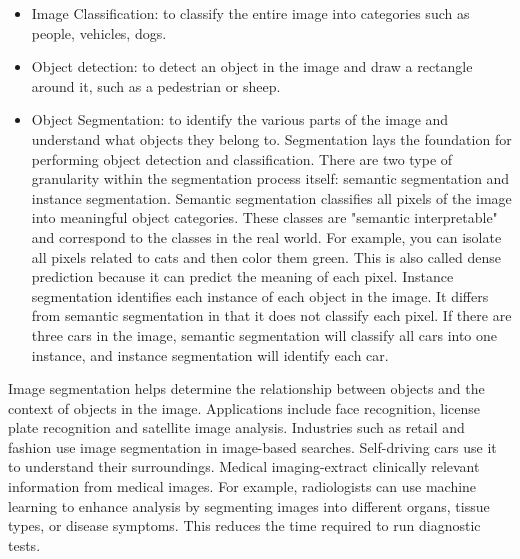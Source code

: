 \begin{itemize}
	\item Image Classification: to classify the entire image into categories such as people, vehicles, dogs.
	\item Object detection: to detect an object in the image and draw a rectangle around it, such as a pedestrian or sheep.
	\item Object Segmentation: to identify the various parts of the image and understand what objects they belong to. Segmentation lays the foundation for performing object detection and classification. There are two type of granularity within the segmentation process itself: semantic segmentation and instance segmentation. Semantic segmentation classifies all pixels of the image into meaningful object categories. These classes are "semantic interpretable" and correspond to the classes in the real world. For example, you can isolate all pixels related to cats and then color them green. This is also called dense prediction because it can predict the meaning of each pixel. Instance segmentation identifies each instance of each object in the image. It differs from semantic segmentation in that it does not classify each pixel. If there are three cars in the image, semantic segmentation will classify all cars into one instance, and instance segmentation will identify each car.
\end{itemize}
Image segmentation helps determine the relationship between objects and the context of objects in the image. Applications include face recognition, license plate recognition and satellite image analysis. Industries such as retail and fashion use image segmentation in image-based searches. Self-driving cars use it to understand their surroundings. Medical imaging-extract clinically relevant information from medical images. For example, radiologists can use machine learning to enhance analysis by segmenting images into different organs, tissue types, or disease symptoms. This reduces the time required to run diagnostic tests.
